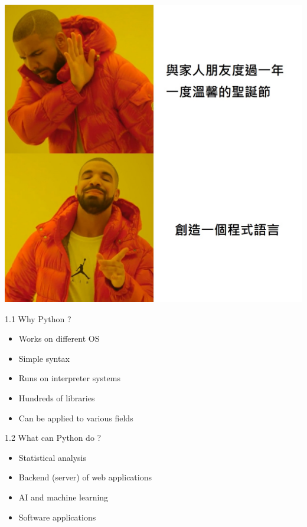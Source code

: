 \documentclass{beamer}
\begin{document}
    \begin{frame}
        \begin{center}
            \includegraphics[scale=0.25]{Drake-Hotline-Bling.jpg}
        \end{center}
    \end{frame}

    \begin{frame}
        \color{blue} \Large 1.1 Why Python ?  \\
        
        \color{black} \normalsize \vskip 10pt 
        \begin{itemize}
            \item Works on different OS 
            \item Simple syntax
            \item Runs on interpreter systems
            \item Hundreds of libraries
            \item Can be applied to various fields
        \end{itemize}
    \end{frame}

    \begin{frame}
        \color{blue} \Large 1.2 What can Python do ?  \\
        
        \color{black} \normalsize \vskip 10pt 
        \begin{itemize}
            \item Statistical analysis
            \item Backend (server) of web applications
            \item AI and machine learning
            \item Software applications
        \end{itemize}
    \end{frame}
    
\end{document}
